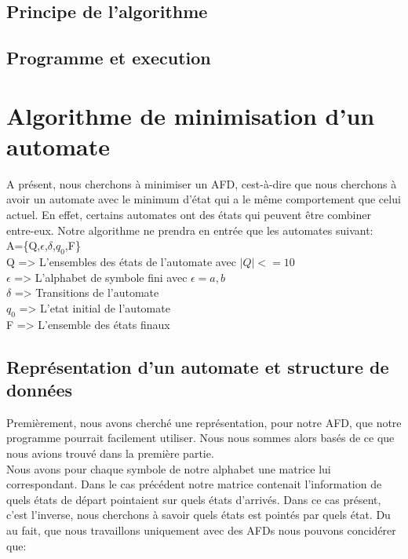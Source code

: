 \documentclass[a4paper]{article}
\begin{document}
\subsection{Principe de l'algorithme}
\subsection{Programme et execution}


\section{Algorithme de minimisation d'un automate}

A présent, nous cherchons à minimiser un AFD, cest-à-dire que nous
cherchons à avoir un automate avec le minimum d'état qui a le même
comportement que celui actuel. En effet, certains automates ont
des états qui peuvent être combiner entre-eux. Notre algorithme ne 
prendra en entrée que les automates suivant: \\

A=\{Q,$\epsilon$,$\delta$,$q_0$,F\}\\
Q => L'ensembles des états de l'automate avec $|Q|<=10$\\
$\epsilon$ => L'alphabet de symbole fini avec $\epsilon={a,b}$\\
$\delta$ => Transitions de l'automate\\
$q_0$ => L'etat initial de l'automate\\
F => L'ensemble des états finaux\\



\subsection{Représentation d'un automate et structure de données}

Premièrement, nous avons cherché une représentation, pour notre
AFD, que notre programme pourrait facilement utiliser. Nous 
nous sommes alors basés de ce que nous avions trouvé dans la 
première partie.\\
Nous avons pour chaque symbole de notre alphabet une matrice lui correspondant. Dans
le cas précédent notre matrice contenait l'information de quels états
de départ pointaient sur quels états d'arrivés. Dans ce cas présent,
c'est l'inverse, nous cherchons à savoir quels états est pointés par
quels état. Du au fait, que nous travaillons uniquement avec des AFDs
nous pouvons concidérer que:\\
\end{document}
